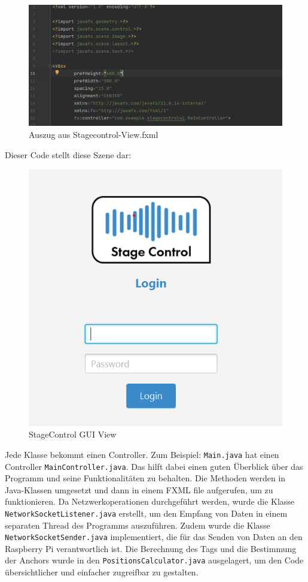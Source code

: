 \begin{figure}[H]
	\centering
	\includegraphics[width=0.9\linewidth]{images/stagecontrol-view.png}
	\caption[Auszug aus Stagecontrol-View.fxml]{Auszug aus Stagecontrol-View.fxml}
	\label{fig:Stagecontrolview}
\end{figure}

\newpage
Dieser Code stellt diese Szene dar:
\begin{figure}[H]
	\centering
	\includegraphics[width=0.7\linewidth]{images/StagecontrolViewGUI.png}
	\caption[StageControl GUI View]{StageControl GUI View}
	\label{fig:StageControlViewGUI}
\end{figure}


Jede Klasse bekommt einen Controller. Zum Beispiel: \texttt{Main.java} hat einen Controller \texttt{MainController.java}. Das hilft dabei einen guten Überblick über das Programm und seine Funktionalitäten zu behalten. Die Methoden werden in Java-Klassen umgesetzt und dann in einem FXML file aufgerufen, um zu funktionieren. Da Netzwerkoperationen durchgeführt werden, wurde die Klasse \texttt{NetworkSocketListener.java} erstellt, um den Empfang von Daten in einem separaten Thread des Programms auszuführen. Zudem wurde die Klasse \texttt{NetworkSocketSender.java} implementiert, die für das Senden von Daten an den Raspberry Pi verantwortlich ist. Die Berechnung des Tags und die Bestimmung der Anchors wurde in den \texttt{PositionsCalculator.java} ausgelagert, um den Code übersichtlicher und einfacher zugreifbar zu gestalten. 

